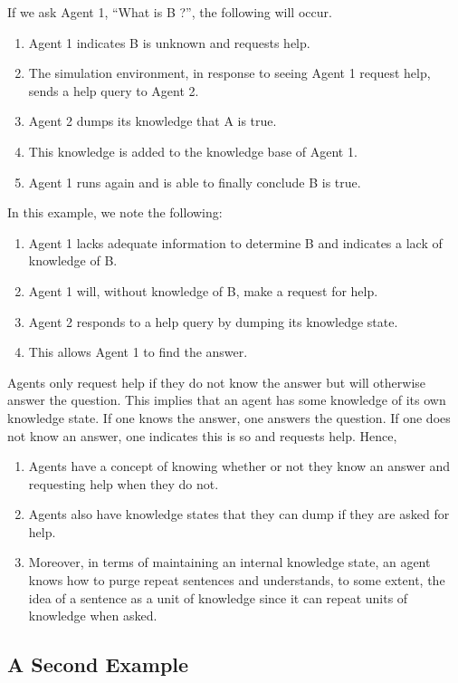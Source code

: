 \documentclass{article}
\begin{document}
If we ask Agent 1, ``What is B ?'', the following will occur.

\begin{enumerate}
	\item Agent 1 indicates B is unknown and requests help.
	\item The simulation environment, in response to seeing Agent 1 request help, sends a help query to Agent 2.
	\item Agent 2 dumps its knowledge that A is true.
	\item This knowledge is added to the knowledge base of Agent 1.
	\item Agent 1 runs again and is able to finally conclude B is true.
\end{enumerate}

In this example, we note the following:

\begin{enumerate}
	\item Agent 1 lacks adequate information to determine B and indicates a lack of knowledge of B.
	\item Agent 1 will, without knowledge of B, make a request for help.
	\item Agent 2 responds to a help query by dumping its knowledge state.
	\item This allows Agent 1 to find the answer.
\end{enumerate}

Agents only request help if they do not know the answer but will otherwise answer the question. This implies that an agent has some knowledge of its own knowledge state. If one knows the answer, one answers the question. If one does not know an answer, one indicates this is so and requests help. Hence,

\begin{enumerate}
	\item Agents have a concept of knowing whether or not they know an answer and requesting help when they do not.
	\item Agents also have knowledge states that they can dump if they are asked for help.
	\item Moreover, in terms of maintaining an internal knowledge state, an agent knows how to purge repeat sentences and understands, to some extent, the idea of a sentence as a unit of knowledge since it can repeat units of knowledge when asked.
\end{enumerate}

\subsection{A Second Example}
\label{example_2}
\end{document}

